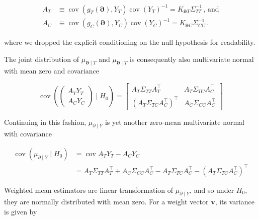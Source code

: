 \documentclass[letter]{article}
\newcommand{\genericdel}[3]{%
      \left#1#3\right#2
    }
\newcommand{\del}[1]{\genericdel(){#1}}
\DeclareMathOperator{\cov}{{cov}}
\newcommand{\trans}{^{\intercal}}
\newcommand{\vvec}{\mathbold{v}}
\newcommand{\boundary}{\partial}
\newcommand{\sentinels}{\bm{\boundary}}
\begin{document}
\begin{equation}
\begin{split}
    A_T &\equiv \cov\del{g_T(\sentinels), Y_T} \cov\del{Y_T}^{-1} = K_{\sentinels T} \Sigma_{TT}^{-1} \,\text{, and} \\
    A_C &\equiv \cov\del{g_C(\sentinels), Y_C} \cov\del{Y_C}^{-1} = K_{\sentinels C} \Sigma_{CC}^{-1}\,.
\end{split}
\end{equation}

where we dropped the explicit conditioning on the null hypothesis for readability.
    


    	The joint distribution of \(\mu_{\sentinels \mid T}\) and \(\mu_{\sentinels \mid T}\) is consequently also multivariate normal with mean zero and covariance

\begin{equation}
    \cov \del{\begin{pmatrix}A_T Y_T \\ A_C Y_C \end{pmatrix} \mid H_0 } = \begin{bmatrix}
                        A_T \Sigma_{TT} A_T\trans & A_T \Sigma_{TC} A_C\trans \\
                        \del{A_T \Sigma_{TC} A_C \trans}\trans & A_C \Sigma_{CC} A_C\trans
                    \end{bmatrix}
\end{equation}

Continuing in this fashion, \(\mu_{\boundary \mid Y}\) is yet another zero-mean multivariate normal with covariance
    


    	\begin{equation}
\begin{split}
    \cov \del{\mu_{\boundary \mid Y} \mid H_0} &= \cov{ A_T Y_T - A_C Y_C } \\
        &= A_T \Sigma_{TT} A_T\trans + A_C \Sigma_{CC} A_C\trans - A_T \Sigma_{TC} A_C\trans -  \del{A_T\Sigma_{TC} A_C\trans}\trans
\end{split}
\end{equation}
    


    	Weighted mean estimators are linear transformation of \(\mu_{\boundary \mid Y}\), and so under \(H_0\), they are normally distributed with mean zero.
For a weight vector \(\vvec\), its variance is given by
\end{document}
